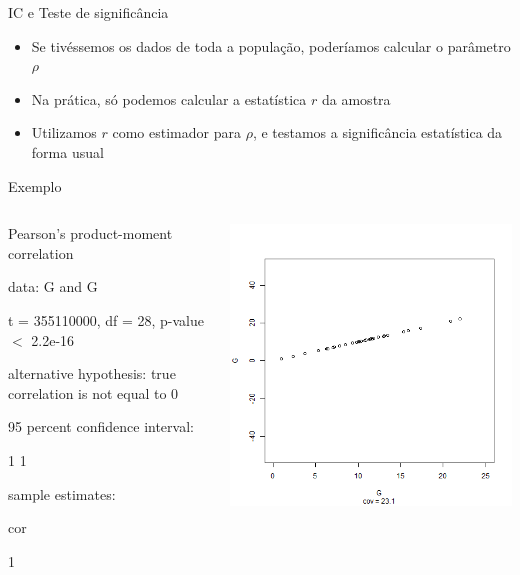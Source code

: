 \documentclass{beamer}
\begin{document}
\begin{frame}{IC e Teste de significância}
  \begin{itemize}
  \item Se tivéssemos os dados de toda a \alert<1>{população}, poderíamos
    calcular o \alert<1>{parâmetro} $\rho$
  \item Na prática, só podemos calcular a \alert<2>{estatística} $r$ da \alert<2>{amostra}
  \item Utilizamos $r$ como estimador para $\rho$, e testamos a
    significância estatística da forma usual
  \end{itemize}
\end{frame}

\begin{frame}{Exemplo}
  \begin{columns}
    \begin{column}{5cm}
      \begin{block}{}
              \tiny
      	Pearson's product-moment correlation

        data:  G and G
        
        t = 355110000, df = 28, p-value $<$ 2.2e-16
        
        alternative hypothesis: true correlation is not equal to 0
        
        95 percent confidence interval:
        
        1 1
        
        sample estimates:
        
        cor

        1 
      \end{block}
   \end{column}
    \begin{column}{5cm}
      \begin{center}
        \includegraphics[height=.8\textheight]{Cap17/anim-0}
      \end{center}
    \end{column}
\end{columns}
\end{frame}
\end{document}
